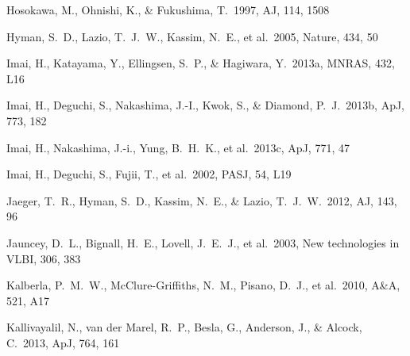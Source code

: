 \begin{thebibliography}{99}
\begin{multicols}{2}
{%


 Hosokawa, M., Ohnishi, K., \& Fukushima, T.\ 1997, AJ, 114, 1508 


 Hyman, S.~D., Lazio, T.~J.~W., Kassim, N.~E., et al.\ 2005, Nature, 434, 50 

 Imai, H., Katayama, Y., Ellingsen, S.~P., \& Hagiwara, Y.\ 2013a, MNRAS, 432, L16 

Imai, H., Deguchi, S., Nakashima, J.-I., Kwok, S., \& Diamond, P.~J.\ 2013b, ApJ, 773, 182 

 Imai, H., Nakashima, J.-i., Yung, B.~H.~K., et al.\ 2013c, ApJ, 771, 47 

 Imai, H., Deguchi, S., Fujii, T., et al.\ 2002, PASJ, 54, L19 


 Jaeger, T.~R., Hyman, S.~D., Kassim, N.~E., \& Lazio, T.~J.~W.\ 2012, AJ, 143, 96 

 Jauncey, D.~L., Bignall, H.~E., Lovell, J.~E.~J., et al.\ 2003, 
New technologies in VLBI, 306, 383 

Kalberla, P.~M.~W., McClure-Griffiths, N.~M., Pisano, D.~J., et al.\ 2010, A\&A, 521, A17 

 Kallivayalil, N., van der Marel, R.~P., Besla, G., Anderson, J., 
\& Alcock, C.\ 2013, ApJ, 764, 161 


}
\end{multicols}
\end{thebibliography}
